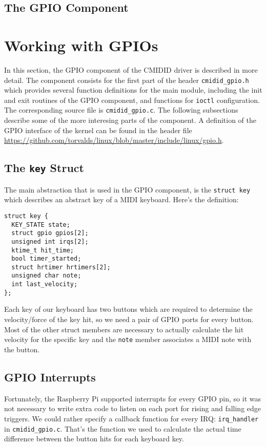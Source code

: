 \documentclass[paper=a4,fontsize=11pt,twocolumn,pagesize,bibtotoc]{scrartcl}
\begin{document}
\subsection{The GPIO Component}
\label{component:gpio}

\section{Working with GPIOs}
\label{michael:gpios}
In this section, the GPIO component of the CMIDID driver is described in more
detail. The component consists for the first part of the header \texttt{cmidid\_gpio.h} which
provides several function definitions for the main module, including the 
init and exit routines of the GPIO component, and functions for \texttt{ioctl}
configuration. The corresponding source file is \texttt{cmidid\_gpio.c}.
The following subsections describe some of the more interesing parts of the 
component. A definition of the GPIO interface of the kernel can be found in 
the header file \url{https://github.com/torvalds/linux/blob/master/include/linux/gpio.h}.

\subsection{The \texttt{key} Struct}
\label{gpios:key}

The main abstraction that is used in the GPIO component, is the \texttt{struct key}
which describes an abstract key of a MIDI keyboard. Here's the definition:
\begin{lstlisting}
struct key {
  KEY_STATE state;
  struct gpio gpios[2];
  unsigned int irqs[2];
  ktime_t hit_time;
  bool timer_started;
  struct hrtimer hrtimers[2];
  unsigned char note;
  int last_velocity;
};
\end{lstlisting}
Each key of our keyboard has two buttons which are required to determine the
velocity/force of the key hit, so we need a pair of GPIO ports for every button.
Most of the other struct members are necessary to actually calculate the 
hit velocity for the specific key and the \texttt{note} member associates a
MIDI note with the button.

\subsection{GPIO Interrupts}
\label{gpios:interrupts}
Fortunately, the Raspberry Pi supported interrupts for every GPIO pin, so it
was not necessary to write extra code to listen on each port for rising and 
falling edge triggers. We could rather specify a callback function for every
IRQ: \texttt{irq\_handler} in \texttt{cmidid\_gpio.c}. That's the function we
used to calculate the actual time difference between the button hits for each
keyboard key.
\end{document}
